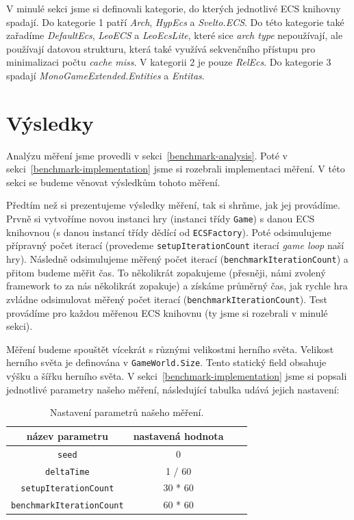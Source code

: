 V minulé sekci jsme si definovali kategorie, do kterých jednotlivé ECS knihovny spadají. Do kategorie 1 patří \textit{Arch}, \textit{HypEcs} a \textit{Svelto.ECS}. Do této kategorie také zařadíme \textit{DefaultEcs}, \textit{LeoECS} a \textit{LeoEcsLite}, které sice \textit{arch type} nepoužívají, ale používají datovou strukturu, která také využívá sekvenčního přístupu pro minimalizaci počtu \textit{cache miss}. V kategorii 2 je pouze \textit{RelEcs}. Do kategorie 3 spadají \textit{MonoGameExtended.Entities} a \textit{Entitas}.

\section{Výsledky}
\label{sec:benchmark-results}
Analýzu měření jsme provedli v sekci~\ref{benchmark-analysis}. Poté v sekci~\ref{benchmark-implementation} jsme si rozebrali implementaci měření. V této sekci se budeme věnovat výsledkům tohoto měření.

Předtím než si prezentujeme výsledky měření, tak si shrňme, jak jej provádíme. Prvně si vytvoříme novou instanci hry (instanci třídy \texttt{Game}) s danou ECS knihovnou (s danou instancí třídy dědící od \texttt{ECSFactory}). Poté odsimulujeme přípravný počet iterací (provedeme \texttt{setupIterationCount} iterací \textit{game loop} naší hry). Následně odsimulujeme měřený počet iterací (\texttt{benchmarkIterationCount}) a přitom budeme měřit čas. To několikrát zopakujeme (přesněji, námi zvolený framework to za nás několikrát zopakuje) a získáme průměrný čas, jak rychle hra zvládne odsimulovat měřený počet iterací (\texttt{benchmarkIterationCount}). Test provádíme pro každou měřenou ECS knihovnu (ty jsme si rozebrali v minulé sekci).

Měření budeme spouštět vícekrát s různými velikostmi herního světa. Velikost herního světa je definována v \texttt{GameWorld.Size}. Tento statický field obsahuje výšku a šířku herního světa. V sekci~\ref{benchmark-implementation} jsme si popsali jednotlivé parametry našeho měření, následující tabulka udává jejich nastavení:

\begin{table}[!htb]
    \centering\footnotesize\sf
    \begin{tabular}{c c c c}
        \toprule
        název parametru & nastavená hodnota \\
        \midrule
        \texttt{seed} & 0 \\
        \texttt{deltaTime} & 1 / 60 \\
        \texttt{setupIterationCount} & 30 * 60 \\
        \texttt{benchmarkIterationCount} & 60 * 60 \\
        \bottomrule
    \end{tabular}
    \caption{Nastavení parametrů našeho měření.}
    \label{tab:benchmark-parameters}
\end{table}

